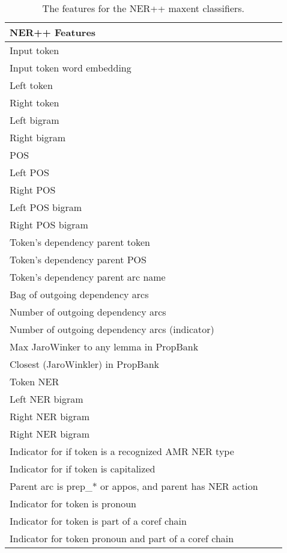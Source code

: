 \documentclass[11pt]{article}
\begin{document}
\begin{table}[ht]
\small
\centering
\begin{tabular}{|l|rl|}
\hline \bf NER++ Features \\ \hline
Input token\\
Input token word embedding\\
Left token\\
Right token\\
Left bigram\\
Right bigram\\
POS\\
Left POS\\
Right POS\\
Left POS bigram\\
Right POS bigram\\
Token's dependency parent token\\
Token's dependency parent POS\\
Token's dependency parent arc name\\
Bag of outgoing dependency arcs\\
Number of outgoing dependency arcs\\
Number of outgoing dependency arcs (indicator)\\
Max JaroWinker to any lemma in PropBank\\
Closest (JaroWinkler) in PropBank\\
Token NER\\
Left NER bigram\\
Right NER bigram\\
Right NER bigram\\
Indicator for if token is a recognized AMR NER type\\
Indicator for if token is capitalized\\
Parent arc is prep\_* or appos, and parent has NER action\\
Indicator for token is pronoun\\
Indicator for token is part of a coref chain\\
Indicator for token pronoun and part of a coref chain\\
\hline
\end{tabular}
\caption{\label{font-table} The features for the NER++ maxent classifiers. }
\end{table}

\end{document}

